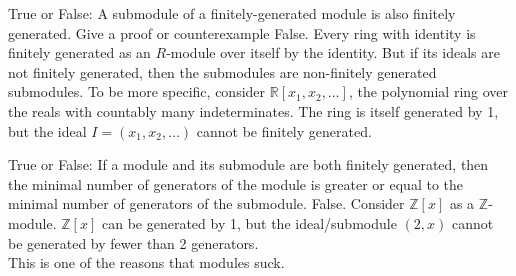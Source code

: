 \documentclass[avery5371,grid]{flashcards}
\newcommand{\R}{\mathbb{R}}
\newcommand{\Z}{\mathbb{Z}}
\newcommand{\rmod}{$R$-module}
\begin{document}


\begin{flashcard}[Modules]{True or False: A submodule of a finitely-generated module is also finitely generated. Give a proof or counterexample}
 False. Every ring with identity is finitely generated as an $R$-module over itself by the identity. But if its ideals are not finitely generated, then the submodules are non-finitely generated submodules. To be more specific, consider $\R[x_1, x_2, \ldots]$, the polynomial ring over the reals with countably many indeterminates. The ring is itself generated by 1, but the ideal $I = (x_1, x_2, \ldots)$ cannot be finitely generated.
\end{flashcard}

\begin{flashcard}[Modules]{True or False: If a module and its submodule are both finitely generated, then the minimal number of generators of the module is greater or equal to the minimal number of generators of the submodule.}
 False. Consider $\Z[x]$ as a $\Z$-module. $\Z[x]$ can be generated by 1, but the ideal/submodule $(2,x)$ cannot be generated by fewer than 2 generators.\\
 
 This is one of the reasons that modules suck.
\end{flashcard}


\end{document}
